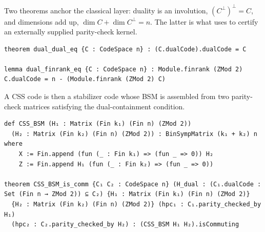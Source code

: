 Two theorems anchor the classical layer: duality is an involution,
$(C^\perp)^\perp = C$, and dimensions add up, $\dim C + \dim C^\perp = n$. The
latter is what  uses to certify an externally supplied parity-check
kernel.

\begin{lstlisting}
theorem dual_dual_eq {C : CodeSpace n} : (C.dualCode).dualCode = C

lemma dual_finrank_eq {C : CodeSpace n} : Module.finrank (ZMod 2) C.dualCode = n - (Module.finrank (ZMod 2) C)
\end{lstlisting}

%

A CSS code is then a stabilizer code whose BSM is assembled from two
parity-check matrices satisfying the dual-containment condition.

\begin{lstlisting}
def CSS_BSM (H₁ : Matrix (Fin k₁) (Fin n) (ZMod 2))
  (H₂ : Matrix (Fin k₂) (Fin n) (ZMod 2)) : BinSympMatrix (k₁ + k₂) n where
    X := Fin.append (fun (_ : Fin k₁) => (fun _ => 0)) H₂
    Z := Fin.append H₁ (fun (_ : Fin k₂) => (fun _ => 0))

theorem CSS_BSM_is_comm {C₁ C₂ : CodeSpace n} (H_dual : (C₁.dualCode : Set (Fin n → ZMod 2)) ⊆ C₂) {H₁ : Matrix (Fin k₁) (Fin n) (ZMod 2)}
  {H₂ : Matrix (Fin k₂) (Fin n) (ZMod 2)} (hpc₁ : C₁.parity_checked_by H₁)
  (hpc₂ : C₂.parity_checked_by H₂) : (CSS_BSM H₁ H₂).isCommuting
\end{lstlisting}

%
%
%
%
%

